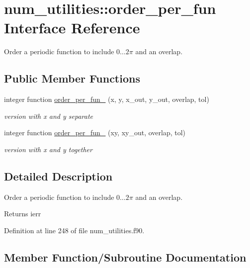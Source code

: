 \hypertarget{interfacenum__utilities_1_1order__per__fun}{}\section{num\+\_\+utilities\+:\+:order\+\_\+per\+\_\+fun Interface Reference}
\label{interfacenum__utilities_1_1order__per__fun}


Order a periodic function to include $0\ldots 2\pi$ and an overlap.  


\subsection*{Public Member Functions}
\begin{DoxyCompactItemize}
\item 
integer function \hyperlink{interfacenum__utilities_1_1order__per__fun_a4c471614ea10f5d51620e4f5d6438263}{order\+\_\+per\+\_\+fun\+\_} (x, y, x\+\_\+out, y\+\_\+out, overlap, tol)
\begin{DoxyCompactList}\small\item\em version with {\ttfamily x} and {\ttfamily y} separate \end{DoxyCompactList}\item 
integer function \hyperlink{interfacenum__utilities_1_1order__per__fun_af2fcf930b3460b3f261ce37ae867bcbf}{order\+\_\+per\+\_\+fun\+\_} (xy, xy\+\_\+out, overlap, tol)
\begin{DoxyCompactList}\small\item\em version with {\ttfamily x} and {\ttfamily y} together \end{DoxyCompactList}\end{DoxyCompactItemize}


\subsection{Detailed Description}
Order a periodic function to include $0\ldots 2\pi$ and an overlap. 

\begin{DoxyReturn}{Returns}
ierr 
\end{DoxyReturn}


Definition at line 248 of file num\+\_\+utilities.\+f90.



\subsection{Member Function/\+Subroutine Documentation}
\mbox{\label{interfacenum__utilities_1_1order__per__fun_a4c471614ea10f5d51620e4f5d6438263}} 
